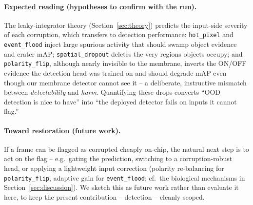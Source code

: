 \paragraph{Expected reading (hypotheses to confirm with the run).}
The leaky-integrator theory (Section~\ref{sec:theory}) predicts the input-side severity of
each corruption, which transfers to detection performance: \texttt{hot\_pixel} and
\texttt{event\_flood} inject large spurious activity that should swamp object evidence and
crater mAP; \texttt{spatial\_dropout} deletes the very regions objects occupy; and
\texttt{polarity\_flip}, although nearly invisible to the membrane, inverts the ON/OFF
evidence the detection head was trained on and should degrade mAP even though our membrane
detector cannot see it -- a deliberate, instructive mismatch between \emph{detectability} and
\emph{harm}. Quantifying these drops converts ``OOD detection is nice to have'' into ``the
deployed detector fails on inputs it cannot flag.''

\paragraph{Toward restoration (future work).}
If a frame can be flagged as corrupted cheaply on-chip, the natural next step is to act on
the flag -- e.g.\ gating the prediction, switching to a corruption-robust head, or applying a
lightweight input correction (polarity re-balancing for \texttt{polarity\_flip}, adaptive
gain for \texttt{event\_flood}; cf.\ the biological mechanisms in
Section~\ref{sec:discussion}). We sketch this as future work rather than evaluate it here, to
keep the present contribution -- detection -- cleanly scoped.
